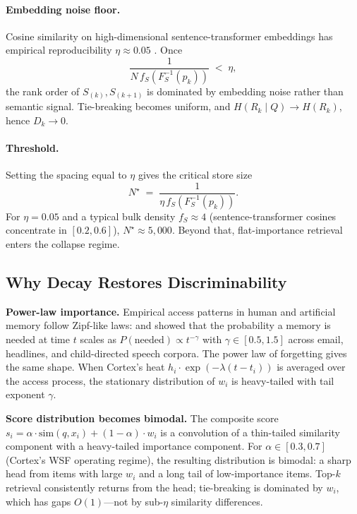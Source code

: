 \documentclass[11pt]{article}
\begin{document}
\paragraph{Embedding noise floor.}
Cosine similarity on high-dimensional sentence-transformer
embeddings has empirical reproducibility $\eta \approx 0.05$
\citep{Reimers2019}.  Once
\[
\frac{1}{N \, f_S(F_S^{-1}(p_k))} \;<\; \eta,
\]
the rank order of $S_{(k)}, S_{(k+1)}$ is dominated by embedding
noise rather than semantic signal.  Tie-breaking becomes uniform,
and $H(R_k \mid Q) \to H(R_k)$, hence $D_k \to 0$.

\paragraph{Threshold.}
Setting the spacing equal to $\eta$ gives the critical store size
\begin{equation}
N^\star \;=\; \frac{1}{\eta \, f_S(F_S^{-1}(p_k))}.
\label{eq:Nstar}
\end{equation}
For $\eta = 0.05$ and a typical bulk density $f_S \approx 4$
(sentence-transformer cosines concentrate in $[0.2, 0.6]$),
$N^\star \approx 5{,}000$.  Beyond that, flat-importance retrieval
enters the collapse regime.

\subsection{Why Decay Restores Discriminability}
\label{app:shannon-restore}

\textbf{Power-law importance.} Empirical access patterns in human
and artificial memory follow Zipf-like laws: \citet{Anderson1989}
and \citet{Anderson1991} showed that the probability a memory is
needed at time $t$ scales as
$P(\mathrm{needed}) \propto t^{-\gamma}$ with
$\gamma \in [0.5, 1.5]$ across email, headlines, and child-directed
speech corpora.  The power law of forgetting \citep{Wixted1991}
gives the same shape.  When Cortex's heat
$h_i \cdot \exp(-\lambda (t - t_i))$ is averaged over the access
process, the stationary distribution of $w_i$ is heavy-tailed with
tail exponent $\gamma$.

\textbf{Score distribution becomes bimodal.}  The composite score
$s_i = \alpha \cdot \mathrm{sim}(q, x_i) + (1 - \alpha) \cdot w_i$
is a convolution of a thin-tailed similarity component with a
heavy-tailed importance component.  For $\alpha \in [0.3, 0.7]$
(Cortex's WSF operating regime), the resulting distribution is
bimodal: a sharp head from items with large $w_i$ and a long tail
of low-importance items.  Top-$k$ retrieval consistently returns
from the head; tie-breaking is dominated by $w_i$, which has gaps
$O(1)$---not by sub-$\eta$ similarity differences.
\end{document}
